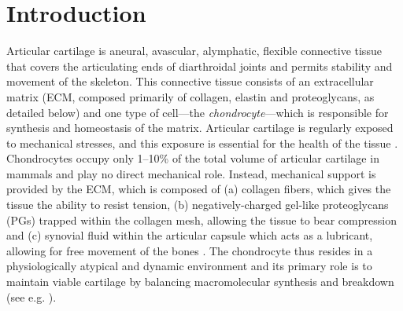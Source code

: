 \section*{Introduction}
\label{introduction}



Articular cartilage is aneural, avascular, alymphatic, flexible connective tissue that covers the
articulating ends of diarthroidal joints \citep{Poole1997,Mankin1982} and permits
stability and movement of the skeleton. This connective tissue
consists of an extracellular matrix (ECM, composed primarily of collagen,
elastin and proteoglycans, as detailed below) and one type of cell---the {\em
chondrocyte}---which is responsible for synthesis and homeostasis of
the matrix. Articular cartilage is regularly exposed to
mechanical stresses, and this exposure is essential for the health of
the tissue \citep{Stockwell1991}. Chondrocytes occupy only 1--10\% of
the total volume of articular cartilage in mammals
\citep{CarneyMuir1988, Halletal1996} and play no direct mechanical
role. Instead, mechanical support is provided by the ECM, which is composed of (a) collagen
fibers, which gives the tissue the ability to resist tension, (b)
negatively-charged gel-like proteoglycans (PGs) trapped within the
collagen mesh, allowing the tissue to bear compression
\citep{Poole1997, BuckwalterMankin1998} and (c) synovial fluid within
the articular capsule which acts as a lubricant, allowing for free
movement of the bones \citep{Edwardsetal1994}. The chondrocyte thus
resides in a physiologically atypical and dynamic environment and its primary role is
to maintain viable cartilage by balancing macromolecular
synthesis and breakdown (see e.g. \citet{Wilkinsetal2000,
Stockwell1991, Fassbender1987}). 

